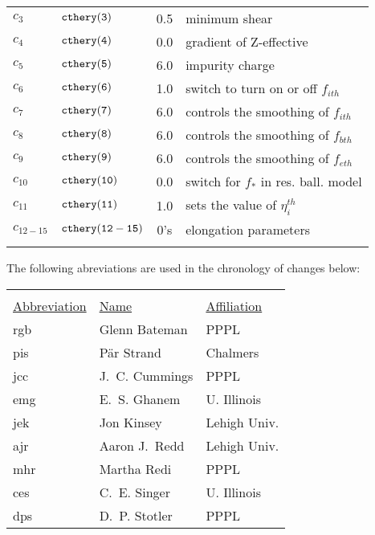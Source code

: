 \begin{table}
\begin{center}
\begin{tabular}{llcp{3.0in}}
$c_{3}$&${\tt cthery(3)}$ & 0.5 & minimum shear \\
$c_{4}$&${\tt cthery(4)}$ & 0.0 & gradient of Z-effective\\
$c_{5}$&${\tt cthery(5)}$ & 6.0 & impurity charge\\
$c_{6}$&${\tt cthery(6)}$ & 1.0 & switch to turn on or off $f_{ith}$\\
$c_{7}$&${\tt cthery(7)}$ & 6.0 & controls the smoothing of $f_{ith}$ \\
$c_{8}$&${\tt cthery(8)}$ & 6.0 & controls the smoothing of $f_{bth}$ \\
$c_{9}$&${\tt cthery(9)}$ & 6.0 & controls the smoothing of $f_{eth}$ \\
$c_{10}$&${\tt cthery(10)}$& 0.0 & switch for $f_{*}$ in res. ball. model\\
$c_{11}$&${\tt cthery(11)}$& 1.0 & sets the value of $\eta_{i}^{th}$\\
$c_{12-15}$&${\tt cthery(12-15)}$&0's & elongation parameters\\
 & & &
\end{tabular}
\end{center}
\end{table}


The following abreviations are used in the chronology of changes below:
\begin{center}
\begin{tabular}{lll}
    &               &             \\
\underline{Abbreviation} & \underline{Name} & \underline{Affiliation}\\
rgb & Glenn Bateman & PPPL \\
pis & P{\"a}r Strand & Chalmers \\
jcc & J.~C. Cummings & PPPL \\
emg & E.~S. Ghanem  & U. Illinois \\
jek & Jon Kinsey    & Lehigh Univ. \\
ajr & Aaron J.~Redd & Lehigh Univ. \\
mhr & Martha Redi   & PPPL \\
ces & C.~E. Singer  & U. Illinois \\
dps & D.~P. Stotler & PPPL \\
\end{tabular}
\end{center}


